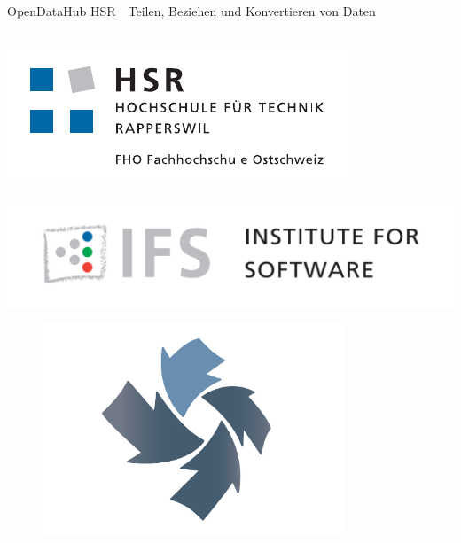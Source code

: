 
\author{
	\rlif \\
	\and
	\chuf \\
	\and
	\fscf \\
}

\clearpage
\begin{titlepage}
	
	\begin{center}
		 \\
		 \\ [25pt]
		\hr{1pt} \\[0.2cm]
		\huge OpenDataHub HSR\ \textendash \ Teilen, Beziehen und Konvertieren von Daten \\
		\hr{1pt} \\[0.2cm]
		
		
		
		\begin{minipage}{0.4\textwidth}
			\includegraphics[width=\textwidth]{fig/hsr-logo}
		\end{minipage}
		\begin{minipage}{0.4\textwidth}
			\includegraphics[width=\textwidth]{fig/ifs-logo}
		\end{minipage}
		\begin{figure}[H]
			\centering
			\includegraphics[width=0.8\textwidth]{fig/logo-odh}
		\end{figure}
		\vfill
	\end{center}
	

\end{titlepage}
